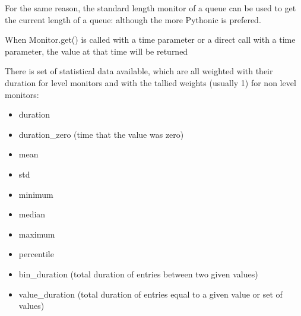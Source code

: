 \documentclass[letterpaper,10pt,english]{sphinxmanual}
\begin{document}
\begin{sphinxVerbatim}[commandchars=\\\{\}]
    
 
   
\end{sphinxVerbatim}

For the same reason, the standard length monitor of a queue can be used to get the current length of a queue:  although
the more Pythonic  is prefered.

When Monitor.get() is called with a time parameter or a direct call with a time parameter, the value at that time will be returned

\begin{sphinxVerbatim}[commandchars=\\\{\}]
   
   
\end{sphinxVerbatim}

There is set of statistical data available, which are all weighted with their duration for level monitors
and with the tallied weights (usually 1) for non level monitors:
\begin{itemize}
\item {} 
duration

\item {} 
duration\_zero (time that the value was zero)

\item {} 
mean

\item {} 
std

\item {} 
minimum

\item {} 
median

\item {} 
maximum

\item {} 
percentile

\item {} 
bin\_duration (total duration of entries between two given values)

\item {} 
value\_duration (total duration of entries equal to a given value or set of values)

\end{itemize}
\end{document}
